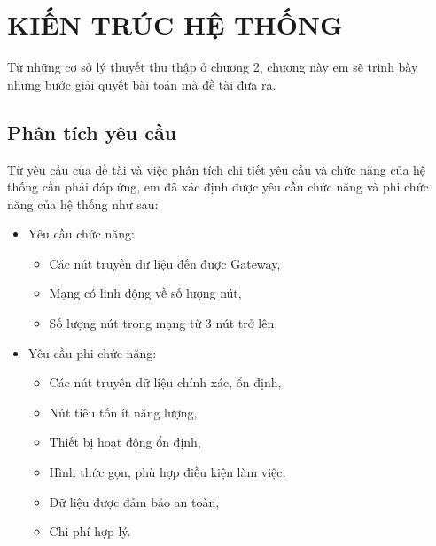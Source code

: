 \chapter{KIẾN TRÚC HỆ THỐNG}
\label{chapter3}
Từ những cơ sở lý thuyết thu thập ở chương 2, chương này em sẽ trình bày những bước giải quyết bài toán mà đề tài đưa ra.
\section{Phân tích yêu cầu}
Từ yêu cầu của đề tài và việc phân tích chi tiết yêu cầu và chức năng của hệ thống cần phải đáp ứng, em đã xác định được yêu cầu chức năng và phi chức năng của hệ thống như sau:
\begin{itemize}
\item	Yêu cầu chức năng:
	\begin{itemize}
	\item	Các nút truyền dữ liệu đến được Gateway,
	\item	Mạng có linh động về số lượng nút,
	\item	Số lượng nút trong mạng từ 3 nút trở lên.
	\end{itemize}
\item Yêu cầu phi chức năng:  
	\begin{itemize}
	\item 	Các nút truyền dữ liệu chính xác, ổn định,
	\item 	Nút tiêu tốn ít năng lượng,
	\item	Thiết bị hoạt động ổn định,
	\item	Hình thức gọn, phù hợp điều kiện làm việc.
	\item	Dữ liệu được đảm bảo an toàn,
	\item	Chi phí hợp lý.
	\end{itemize}
\end{itemize}
